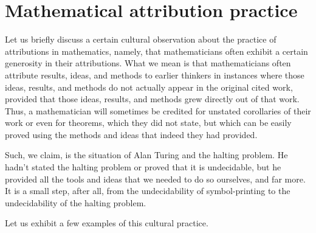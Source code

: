 \documentclass{amsart}
\begin{document}
\section{Mathematical attribution practice}

Let us briefly discuss a certain cultural observation about the practice of attributions in mathematics, namely, that mathematicians often exhibit a certain generosity in their attributions. What we mean is that mathematicians often attribute results, ideas, and methods to earlier thinkers in instances where those ideas, results, and methods do not actually appear in the original cited work, provided that those ideas, results, and methods grew directly out of that work. Thus, a mathematician will sometimes be credited for unstated corollaries of their work or even for theorems, which they did not state, but which can be easily proved using the methods and ideas that indeed they had provided.

Such, we claim, is the situation of Alan Turing and the halting problem. He hadn't stated the halting problem or proved that it is undecidable, but he provided all the tools and ideas that we needed to do so ourselves, and far more. It is a small step, after all, from the undecidability of symbol-printing to the undecidability of the halting problem.

Let us exhibit a few examples of this cultural practice.
\end{document}
